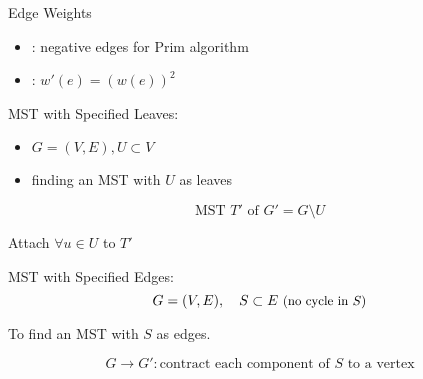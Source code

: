 \begin{frame}{}
  \begin{exampleblock}{Edge Weights}
    \begin{itemize}
      \item {}: negative edges for Prim algorithm
      \item {}: $w'(e) = (w(e))^{2}$
    \end{itemize}
  \end{exampleblock}
\end{frame}

\begin{frame}{}
  \begin{exampleblock}{MST with Specified Leaves: }
    \begin{itemize}
      \item $G = (V, E), U \subset V$
      \item finding an MST with $U$ as leaves
    \end{itemize}
  \end{exampleblock}

  \pause

  \vspace{-0.30cm}
  \[
    \text{MST } T' \text{ of } G' = G \setminus U
  \]

  \pause
  \centerline{Attach $\forall u \in U$ to $T'$ {}}
\end{frame}

\begin{frame}{}
  \begin{block}{MST with Specified Edges: }
    \[
      G = (V,E),\quad S \subset E \text{ \small (no cycle in $S$)}
    \]
    
    \centerline{To find an MST with $S$ as edges.}
  \end{block}

  \pause
  \[
    G \to G': \text{contract each component of $S$ to a vertex}
  \]
\end{frame}


